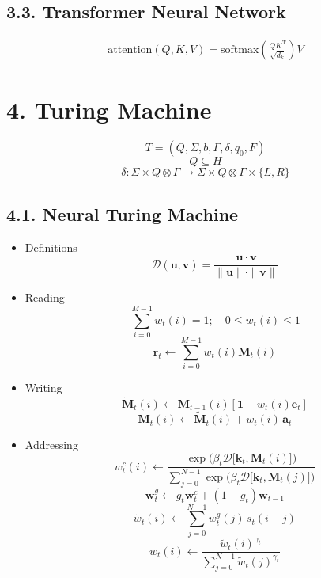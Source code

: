 \documentclass[
]{article}
\begin{document}
\hypertarget{transformer-neural-network}{%
\subsection{3.3. Transformer Neural
Network}\label{transformer-neural-network}}

\[{\displaystyle {\begin{aligned}{\text{attention}}(Q, K, V)={\text{softmax}}\left({\frac{QK^{\mathrm{T}}}{\sqrt{d_{k}}}}\right)V\end{aligned}}}\]

\hypertarget{turing-machine}{%
\section{4. Turing Machine}\label{turing-machine}}

\[{\displaystyle T = (Q, \Sigma, b, \Gamma, \delta, q_{0}, F)}\]
\[{\displaystyle Q \subseteq H}\]
\[{\displaystyle \delta : \Sigma \times Q \otimes \Gamma \to \Sigma \times Q \otimes \Gamma \times \{L, R\}}\]

\hypertarget{neural-turing-machine}{%
\subsection{4.1. Neural Turing Machine}\label{neural-turing-machine}}

\begin{itemize}
\item
  Definitions
  \[{\displaystyle {\mathcal{D}}(\mathbf{u},\mathbf{v})={\frac{\mathbf{u} \cdot \mathbf{v}}{\|\mathbf{u} \| \cdot \| \mathbf{v} \|}}}\]
\item
  Reading \[\sum_{i=0}^{M-1} w_t(i) = 1; \quad 0 \leq w_t(i) \leq 1\]
  \[\mathbf{r}_t \longleftarrow \sum_{i=0}^{M-1}{w_t(i) \mathbf{M}_t(i)}\]
\item
  Writing
  \[\mathbf{\tilde{M}}_t(i) \longleftarrow \mathbf{M}_{t-1}(i) \left[\mathbf{1}-w_t(i) \mathbf{e}_t\right]\]
  \[\mathbf{M}_t(i) \longleftarrow \mathbf{\tilde{M}}_t(i) + w_t(i)\, \mathbf{a}_t\]
\item
  Addressing
  \[w^c_t(i) \longleftarrow \frac{\exp\bigg(\beta_t \mathcal{D} \big[\mathbf{k}_t, \mathbf{M}_t(i)\big]\bigg)}{\sum_{j=0}^{N-1} \exp\bigg(\beta_t \mathcal{D} \big[\mathbf{k}_t, \mathbf{M}_t(j)\big]\bigg)}\]
  \[\mathbf{w}^g_t \longleftarrow g_t \mathbf{w}^c_{t}  + (1-g_t) \mathbf{w}_{t-1}\]
  \[\tilde{w}_t(i) \longleftarrow \sum_{j=0}^{N-1} w^g_t(j)\, s_t(i-j)\]
  \[w_t(i) \longleftarrow \frac{\tilde{w}_t(i)^{\gamma_t}}{\sum_{j=0}^{N-1} \tilde{w}_t(j)^{\gamma_t}}\]
\end{itemize}
\end{document}
